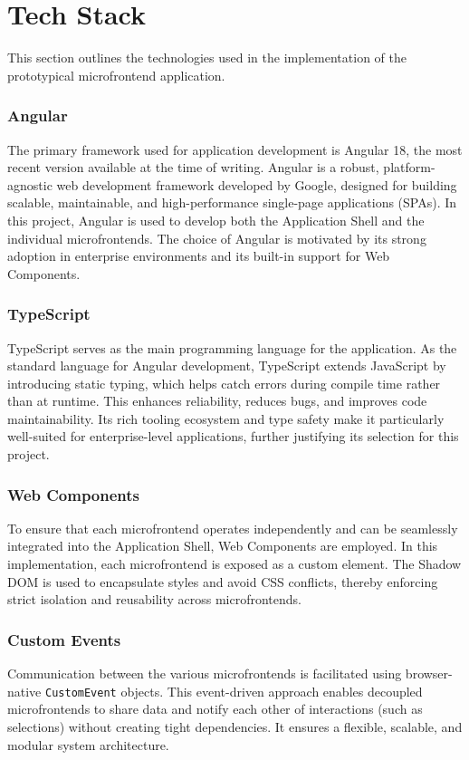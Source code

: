 \section{Tech Stack}
This section outlines the technologies used in the implementation of the prototypical microfrontend application.

\subsubsection*{Angular}
The primary framework used for application development is Angular 18, the most recent version available at the time of writing. Angular is a robust, platform-agnostic web development framework developed by Google, designed for building scalable, maintainable, and high-performance single-page applications (SPAs). In this project, Angular is used to develop both the Application Shell and the individual microfrontends. The choice of Angular is motivated by its strong adoption in enterprise environments and its built-in support for Web Components.

\subsubsection*{TypeScript}
TypeScript serves as the main programming language for the application. As the standard language for Angular development, TypeScript extends JavaScript by introducing static typing, which helps catch errors during compile time rather than at runtime. This enhances reliability, reduces bugs, and improves code maintainability. Its rich tooling ecosystem and type safety make it particularly well-suited for enterprise-level applications, further justifying its selection for this project.

\subsubsection*{Web Components}
To ensure that each microfrontend operates independently and can be seamlessly integrated into the Application Shell, Web Components are employed. In this implementation, each microfrontend is exposed as a custom element. The Shadow DOM is used to encapsulate styles and avoid CSS conflicts, thereby enforcing strict isolation and reusability across microfrontends.

\subsubsection*{Custom Events}
Communication between the various microfrontends is facilitated using browser-native \texttt{CustomEvent} objects. This event-driven approach enables decoupled microfrontends to share data and notify each other of interactions (such as selections) without creating tight dependencies. It ensures a flexible, scalable, and modular system architecture.

